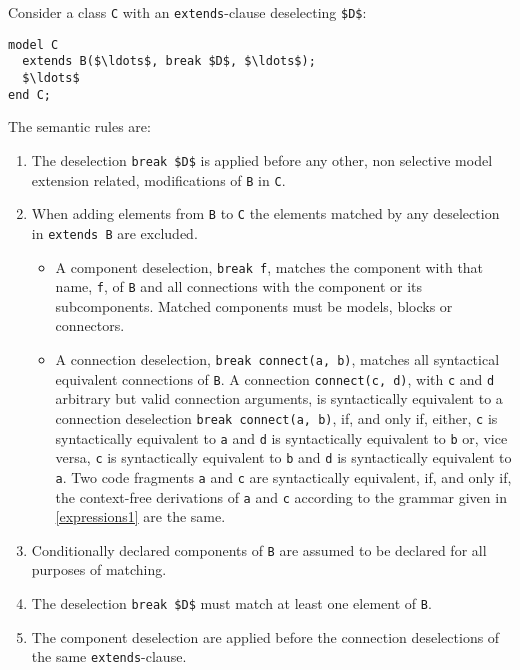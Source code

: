 Consider a class \lstinline!C! with an \lstinline!extends!-clause deselecting \lstinline!$D$!:
\begin{lstlisting}[language=modelica]
model C
  extends B($\ldots$, break $D$, $\ldots$);
  $\ldots$
end C;
\end{lstlisting}
The semantic rules are:
\begin{enumerate}
\item The deselection \lstinline!break $D$! is applied before any other, non selective model extension related, modifications of \lstinline!B! in \lstinline!C!.
\item When adding elements from \lstinline!B! to \lstinline!C! the elements matched by any deselection in \lstinline!extends B! are excluded.
\begin{itemize}
\item A component deselection, \lstinline!break f!, matches the component with that name, \lstinline!f!, of \lstinline!B! and all connections with the component or its subcomponents.
Matched components must be models, blocks or connectors.
\item A connection deselection, \lstinline!break connect(a, b)!, matches all syntactical equivalent connections of \lstinline!B!.
A connection \lstinline!connect(c, d)!, with \lstinline!c! and \lstinline!d! arbitrary but valid connection arguments, is syntactically equivalent to a connection deselection \lstinline!break connect(a, b)!, if, and only if, either, \lstinline!c! is syntactically equivalent to \lstinline!a! and \lstinline!d! is syntactically equivalent to \lstinline!b! or, vice versa, \lstinline!c! is syntactically equivalent to \lstinline!b! and \lstinline!d! is syntactically equivalent to \lstinline!a!.
Two code fragments \lstinline!a! and \lstinline!c! are syntactically equivalent, if, and only if, the context-free derivations of \lstinline!a! and \lstinline!c! according to the grammar given in \cref{expressions1} are the same.
\end{itemize}
\item Conditionally declared components of \lstinline!B! are assumed to be declared for all purposes of matching.
\item The deselection \lstinline!break $D$! must match at least one element of \lstinline!B!.
\item The component deselection are applied before the connection deselections of the same \lstinline!extends!-clause.
\end{enumerate}

